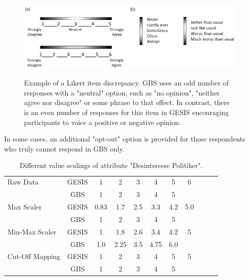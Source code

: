 \begin{figure}[ht]
	\begin{center}
		\includegraphics[scale=0.55,angle=0]{fig/scales}
		\label{6_5}
		\caption{Example of a Likert item discrepancy. GBS uses an odd number of responses with a "neutral" option, such as "no opinion", "neither agree nor disagree" or some phrase to that effect. In contrast, there is an even number of responses for this item in GESIS encouraging participants to voice a positive or negative opinion.}
	\end{center}
\end{figure}

In some cases, an additional "opt-out" option is provided for those respondents who truly cannot respond in GBS only.

\begin{table}[ht]
    \begin{center}
            {\footnotesize
            \begin{tabular}{l|c|ccccccccc}
                \hline \hline
		Raw Data & GESIS & 1 & 2 & 3 & 4 & 5 & 6 \\
                     & GBS & 1 & 2 & 3 & 4 & 5 & \\
                \hline
		Max Scaler & GESIS & 0.83 & 1.7 & 2.5 & 3.3 & 4.2 & 5.0 \\
                     & GBS & 1 & 2 & 3 & 4 & 5 & \\
                \hline
		Min-Max Scaler & GESIS & 1 & 1.8 & 2.6 & 3.4 & 4.2 & 5 \\
                     & GBS & 1.0 & 2.25 & 3.5 & 4.75 & 6.0 & \\
                \hline
		Cut-Off Mapping & GESIS & 1 & 2 & 3 & 4 & 5 & 5 \\
                     & GBS & 1 & 2 & 3 & 4 & 5 & \\
            \end{tabular}}
        \caption{Different value scalings of attribute "Desinteresse Politiker".}
\label{Tab:DescripStatsRawData}
\end{center}
\end{table}

